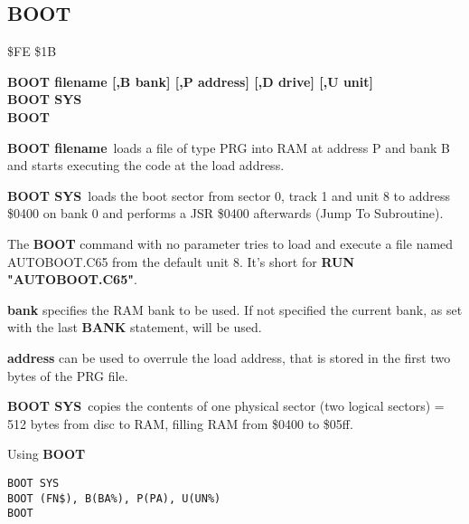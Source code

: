 \subsection{BOOT}
\begin{description}[leftmargin=2cm,style=nextline]
\item [Token:] \$FE \$1B
\item [Format:] {\bf BOOT filename [,B bank]
                [,P address]  [,D drive] [,U unit] } \\
                {\bf BOOT SYS} \\
                {\bf BOOT} 
\item [Usage:]
   {\bf BOOT filename} loads a file of type
   PRG into RAM at address P and bank B and starts executing
   the code at the load address.

   {\bf BOOT SYS} loads the boot sector from sector 0,
   track 1 and unit 8 to address \$0400 on bank 0 and
   performs a JSR \$0400 afterwards (Jump To Subroutine).

   The {\bf BOOT} command with no parameter tries to load
   and execute a file named AUTOBOOT.C65 from the default unit 8.
   It's short for {\bf RUN "AUTOBOOT.C65"}.

   \filenamedefinition

   {\bf bank} specifies the RAM bank to be used.
   If not specified the current bank, as set with the last
   {\bf BANK} statement, will be used.

   {\bf address} can be used to overrule the load address,
   that is stored in the first two bytes of the PRG file.

   \drivedefinition

   \unitdefinition

\item [Remarks:]
   {\bf BOOT SYS} copies the contents of one physical sector
   (two logical sectors) = 512 bytes from disc to RAM,
   filling RAM from \$0400 to \$05ff.

\item [Example:] Using {\bf BOOT}
\begin{tcolorbox}[colback=black,coltext=white]
\verbatimfont{\codefont}
\begin{verbatim}
BOOT SYS
BOOT (FN$), B(BA%
BOOT
\end{verbatim}
\end{tcolorbox}
\end{description}



